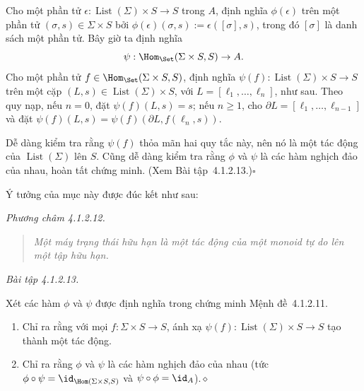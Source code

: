 Cho một phần tử $\epsilon:\operatorname{List}(\Sigma)\times S\to S$ trong $A$, định nghĩa $\phi(\epsilon)$ trên một phần tử $(\sigma,s)\in\Sigma\times S$ bởi $\phi(\epsilon)(\sigma,s):=\epsilon([\sigma],s)$, trong đó $[\sigma]$ là danh sách một phần tử. Bây giờ ta định nghĩa
\[
\psi:\Hom_{\Set}(\Sigma\times S,S)\to A.
\]
Cho một phần tử $f\in\Hom_{\Set}(\Sigma\times S,S)$, định nghĩa $\psi(f):\operatorname{List}(\Sigma)\times S\to S$ trên một cặp $(L,s)\in\operatorname{List}(\Sigma)\times S$, với $L=[\ell_1,\ldots,\ell_n]$, như sau. Theo quy nạp, nếu $n=0$, đặt $\psi(f)(L,s)=s$; nếu $n\ge1$, cho $\partial L=[\ell_1,\ldots,\ell_{n-1}]$ và đặt $\psi(f)(L,s)=\psi(f)(\partial L,f(\ell_n,s))$.

Dễ dàng kiểm tra rằng $\psi(f)$ thỏa mãn hai quy tắc này, nên nó là một tác động của $\operatorname{List}(\Sigma)$ lên $S$. Cũng dễ dàng kiểm tra rằng $\phi$ và $\psi$ là các hàm nghịch đảo của nhau, hoàn tất chứng minh. (Xem Bài tập~4.1.2.13.)\hfill$\square$

Ý tưởng của mục này được đúc kết như sau:

\noindent\textit{Phương châm 4.1.2.12.}\keepwithnext
\begin{quote}\emph{Một máy trạng thái hữu hạn là một tác động của một monoid tự do lên một tập hữu hạn.}\end{quote}

\noindent\textit{Bài tập 4.1.2.13.}\keepwithnext

Xét các hàm $\phi$ và $\psi$ được định nghĩa trong chứng minh Mệnh đề~4.1.2.11.
\begin{enumerate}[label=\alph*.]
\item Chỉ ra rằng với mọi $f:\Sigma\times S\to S$, ánh xạ $\psi(f):\operatorname{List}(\Sigma)\times S\to S$ tạo thành một tác động.
\item Chỉ ra rằng $\phi$ và $\psi$ là các hàm nghịch đảo của nhau (tức $\phi\circ\psi=\id_{\Hom(\Sigma\times S,S)}$ và $\psi\circ\phi=\id_A$).\nobreak\hfill$\diamond$
\end{enumerate}

